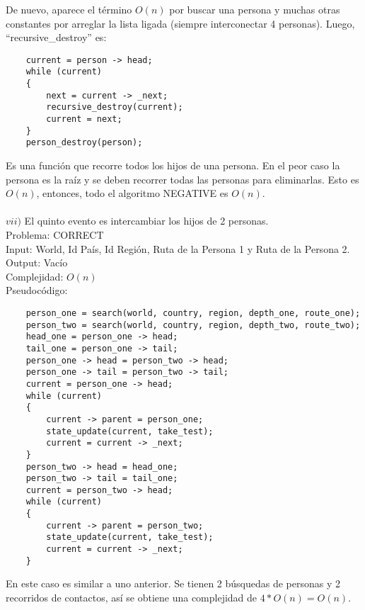 \documentclass[letter]{article}
\begin{document}
\begin{parte}{1}
	De nuevo, aparece el término $O(n)$ por buscar una persona y muchas otras constantes por arreglar la lista ligada (siempre interconectar 4 personas). Luego, ``recursive\_destroy'' es:\\
	
	\begin{lstlisting}
	current = person -> head;
	while (current)
	{
		next = current -> _next;
		recursive_destroy(current);
		current = next;
	}
	person_destroy(person);
	\end{lstlisting}
	\vspace{0.2cm}
	
	Es una función que recorre todos los hijos de una persona. En el peor caso la persona es la raíz y se deben recorrer todas las personas para eliminarlas. Esto es $O(n)$, entonces, todo el algoritmo NEGATIVE es $O(n)$.\\\\
	
	\noindent
	$vii)$ El quinto evento es intercambiar los hijos de 2 personas.\\
	
	\noindent
	Problema: CORRECT\\
	Input: World, Id País, Id Región, Ruta de la Persona 1 y Ruta de la Persona 2.\\
	Output: Vacío\\
	Complejidad: $O(n)$\\
	Pseudocódigo:
	
	\begin{lstlisting}
	person_one = search(world, country, region, depth_one, route_one);
	person_two = search(world, country, region, depth_two, route_two);
	head_one = person_one -> head;
	tail_one = person_one -> tail;
	person_one -> head = person_two -> head;
	person_one -> tail = person_two -> tail;
	current = person_one -> head;
	while (current)
	{
		current -> parent = person_one;
		state_update(current, take_test);
		current = current -> _next;
	}
	person_two -> head = head_one;
	person_two -> tail = tail_one;
	current = person_two -> head;
	while (current)
	{
		current -> parent = person_two;
		state_update(current, take_test);
		current = current -> _next;
	}
	\end{lstlisting}
	\vspace{0.2cm}
	
	En este caso es similar a uno anterior. Se tienen 2 búsquedas de personas y 2 recorridos de contactos, así se obtiene una complejidad de $4*O(n) = O(n)$.\\\\
	

\end{parte}
\end{document}
